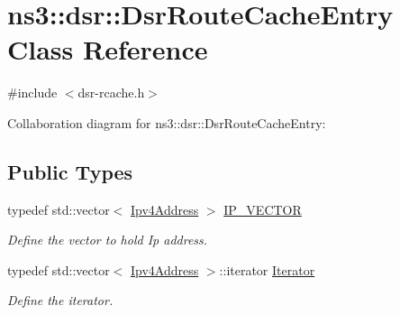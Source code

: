 \hypertarget{classns3_1_1dsr_1_1DsrRouteCacheEntry}{}\section{ns3\+:\+:dsr\+:\+:Dsr\+Route\+Cache\+Entry Class Reference}
\label{classns3_1_1dsr_1_1DsrRouteCacheEntry}


{\ttfamily \#include $<$dsr-\/rcache.\+h$>$}



Collaboration diagram for ns3\+:\+:dsr\+:\+:Dsr\+Route\+Cache\+Entry\+:
\subsection*{Public Types}
\begin{DoxyCompactItemize}
\item 
typedef std\+::vector$<$ \hyperlink{classns3_1_1Ipv4Address}{Ipv4\+Address} $>$ \hyperlink{classns3_1_1dsr_1_1DsrRouteCacheEntry_ab834177006bdbfd2e3fa607c2a88cbdf}{I\+P\+\_\+\+V\+E\+C\+T\+OR}
\begin{DoxyCompactList}\small\item\em Define the vector to hold Ip address. \end{DoxyCompactList}\item 
typedef std\+::vector$<$ \hyperlink{classns3_1_1Ipv4Address}{Ipv4\+Address} $>$\+::iterator \hyperlink{classns3_1_1dsr_1_1DsrRouteCacheEntry_a792d7d6ba24302a5e075c5c37589f1d8}{Iterator}
\begin{DoxyCompactList}\small\item\em Define the iterator. \end{DoxyCompactList}\end{DoxyCompactItemize}
